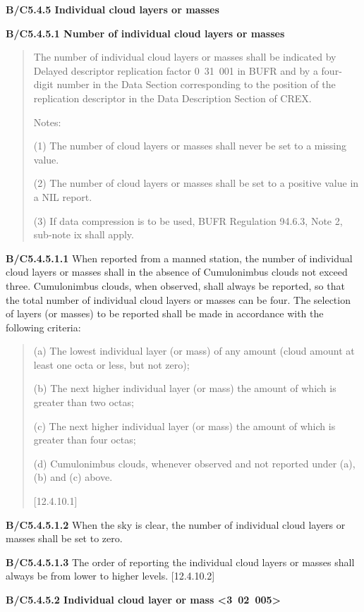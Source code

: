 \textbf{B/C5.4.5 Individual cloud layers or masses}

\textbf{B/C5.4.5.1 Number of individual cloud layers or masses}

\begin{quote}
The number of individual cloud layers or masses shall be indicated by Delayed descriptor replication factor 0~31~001 in BUFR and by a four-digit number in the Data Section corresponding to the position of the replication descriptor in the Data Description Section of CREX.

Notes:

(1) The number of cloud layers or masses shall never be set to a missing value.

(2) The number of cloud layers or masses shall be set to a positive value in a NIL report.

(3) If data compression is to be used, BUFR Regulation 94.6.3, Note 2, sub-note ix shall apply.
\end{quote}

\textbf{B/C5.4.5.1.1} When reported from a manned station, the number of individual cloud layers or masses shall in the absence of Cumulonimbus clouds not exceed three. Cumulonimbus clouds, when observed, shall always be reported, so that the total number of individual cloud layers or masses can be four. The selection of layers (or masses) to be reported shall be made in accordance with the following criteria:

\begin{quote}
(a) The lowest individual layer (or mass) of any amount (cloud amount at least one octa or less, but not zero);

(b) The next higher individual layer (or mass) the amount of which is greater than two octas;

(c) The next higher individual layer (or mass) the amount of which is greater than four octas;

(d) Cumulonimbus clouds, whenever observed and not reported under (a), (b) and (c) above.

{[}12.4.10.1{]}
\end{quote}

\textbf{B/C5.4.5.1.2} When the sky is clear, the number of individual cloud layers or masses shall be set to zero.

\textbf{B/C5.4.5.1.3} The order of reporting the individual cloud layers or masses shall always be from lower to higher levels. {[}12.4.10.2{]}

\textbf{B/C5.4.5.2 Individual cloud layer or mass \textless3~02~005\textgreater{}}

